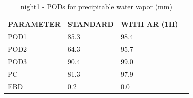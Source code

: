 \begin{table}[p!]
\begin{center}
\begin{tabular}{|l|l|l|l|}
\hline
\multicolumn{1}{|c|}{\cellcolor[HTML]{C0C0C0}\textbf{PARAMETER}} & \multicolumn{1}{c|}{\cellcolor[HTML]{C0C0C0}\textbf{STANDARD}} & \multicolumn{1}{c|}{\cellcolor[HTML]{C0C0C0}\textbf{WITH AR (1H)}} \\
\hline
\cellcolor[HTML]{C0C0C0}POD1  & 85.3                                & 98.4         \\
\cellcolor[HTML]{C0C0C0}POD2  & 64.3                                & 95.7         \\
\cellcolor[HTML]{C0C0C0}POD3  & 90.4                                & 99.0         \\
\cellcolor[HTML]{C0C0C0}PC    & 81.3                                  & 97.9           \\
\cellcolor[HTML]{C0C0C0}EBD   & 0.2                                 & 0.0          \\
\hline
\end{tabular}
\caption{night1 - PODs for precipitable water vapor (mm)}
\label{tab:podpwv:night1}
\end{center}
\end{table}
